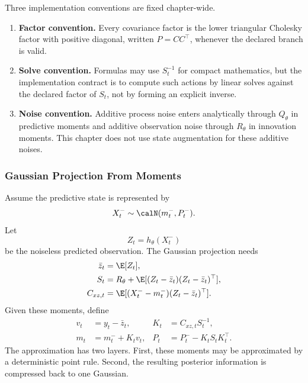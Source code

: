 Three implementation conventions are fixed chapter-wide.
\begin{enumerate}[leftmargin=0.28in]
  \item \textbf{Factor convention.}  Every covariance factor is the lower
  triangular Cholesky factor with positive diagonal, written \(P=CC^\top\),
  whenever the declared branch is valid.
  \item \textbf{Solve convention.}  Formulas may use \(S_t^{-1}\) for compact
  mathematics, but the implementation contract is to compute such actions by
  linear solves against the declared factor of \(S_t\), not by forming an
  explicit inverse.
  \item \textbf{Noise convention.}  Additive process noise enters analytically
  through \(Q_\theta\) in predictive moments and additive observation noise
  through \(R_\theta\) in innovation moments.  This chapter does not use state
  augmentation for these additive noises.
\end{enumerate}

\subsubsection{Gaussian Projection From Moments}
\label{sec:bf-hd-gq-projection}

Assume the predictive state is represented by
\begin{equation}
  X_t^-\sim\calN(m_t^-,P_t^-).
  \label{eq:bf-hd-gq-predictive-gaussian}
\end{equation}
Let
\begin{equation}
  Z_t=h_\theta(X_t^-)
  \label{eq:bf-hd-gq-predicted-observation}
\end{equation}
be the noiseless predicted observation.  The Gaussian projection needs
\begin{align}
  \bar z_t &= \E[Z_t],
  \label{eq:bf-hd-gq-zbar}\\
  S_t &= R_\theta+\E[(Z_t-\bar z_t)(Z_t-\bar z_t)^\top],
  \label{eq:bf-hd-gq-S}\\
  C_{xz,t}&=\E[(X_t^- -m_t^-)(Z_t-\bar z_t)^\top].
  \label{eq:bf-hd-gq-Cxz}
\end{align}
Given these moments, define
\begin{align}
  v_t&=y_t-\bar z_t,
  &
  K_t&=C_{xz,t}S_t^{-1},
  \label{eq:bf-hd-gq-v-K}\\
  m_t&=m_t^-+K_tv_t,
  &
  P_t&=P_t^- - K_tS_tK_t^\top.
  \label{eq:bf-hd-gq-projection-update}
\end{align}
The approximation has two layers.  First, these moments may be approximated by a
deterministic point rule.  Second, the resulting posterior information is
compressed back to one Gaussian.

